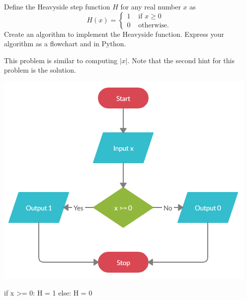 \documentclass{ximera}
\begin{document}
\begin{question}
Define the Heavyside step function $H$ for any real number $x$ as
	$$H(x)=\begin{cases} 1 &\text{ if $x\geq 0$}\\
		0 &\text{ otherwise.}
	\end{cases}$$
Create an algorithm to implement the Heavyside function. Express your algorithm as a flowchart and in Python.
	\begin{hint}
		This problem is similar to computing $|x|$. Note that the second hint for this problem is the solution.
	\end{hint}
	\begin{hint}
	\begin{center}
		\includegraphics{heavy.png}
	\end{center}
\begin{sageCell}
if x >= 0:
        H = 1
else:
        H = 0
\end{sageCell}
	\end{hint}
\end{question}
\end{document}
